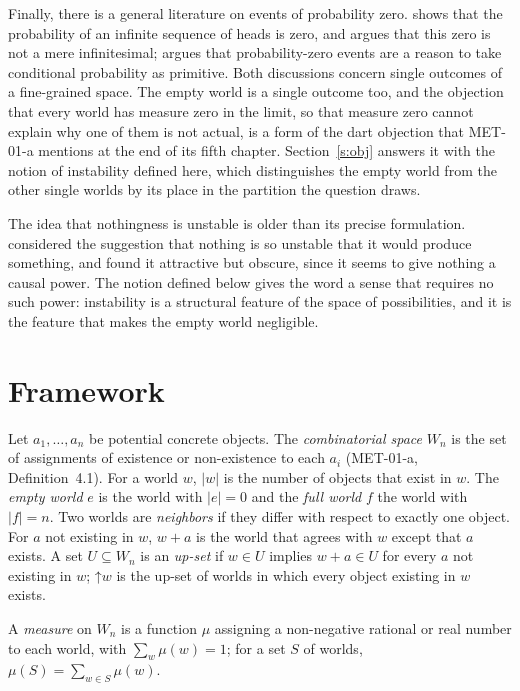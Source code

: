 \documentclass{situationist-preprint}
\begin{document}
Finally, there is a general literature on events of probability zero. \citet{Williamson2007} shows that the probability of an infinite sequence of heads is zero, and argues that this zero is not a mere infinitesimal; \citet{Hajek2003} argues that probability-zero events are a reason to take conditional probability as primitive. Both discussions concern single outcomes of a fine-grained space. The empty world is a single outcome too, and the objection that every world has measure zero in the limit, so that measure zero cannot explain why one of them is not actual, is a form of the dart objection that MET-01-a mentions at the end of its fifth chapter. Section~\ref{s:obj} answers it with the notion of instability defined here, which distinguishes the empty world from the other single worlds by its place in the partition the question draws.

The idea that nothingness is unstable is older than its precise formulation. \citet[ch.~2]{Nozick1981} considered the suggestion that nothing is so unstable that it would produce something, and found it attractive but obscure, since it seems to give nothing a causal power. The notion defined below gives the word a sense that requires no such power: instability is a structural feature of the space of possibilities, and it is the feature that makes the empty world negligible.

\section{Framework}\label{s:frame}

\begin{definition}\label{d:space}
Let $a_1, \ldots, a_n$ be potential concrete objects. The \emph{combinatorial space} $W_n$ is the set of assignments of existence or non-existence to each $a_i$ (MET-01-a, Definition~4.1). For a world $w$, $|w|$ is the number of objects that exist in $w$. The \emph{empty world} $e$ is the world with $|e| = 0$ and the \emph{full world} $f$ the world with $|f| = n$. Two worlds are \emph{neighbors} if they differ with respect to exactly one object. For $a$ not existing in $w$, $w + a$ is the world that agrees with $w$ except that $a$ exists. A set $U \subseteq W_n$ is an \emph{up-set} if $w \in U$ implies $w + a \in U$ for every $a$ not existing in $w$; $\mathord{\uparrow} w$ is the up-set of worlds in which every object existing in $w$ exists.
\end{definition}

\begin{definition}\label{d:measure}
A \emph{measure} on $W_n$ is a function $\mu$ assigning a non-negative rational or real number to each world, with $\sum_{w} \mu(w) = 1$; for a set $S$ of worlds, $\mu(S) = \sum_{w \in S} \mu(w)$.
\end{definition}
\end{document}
